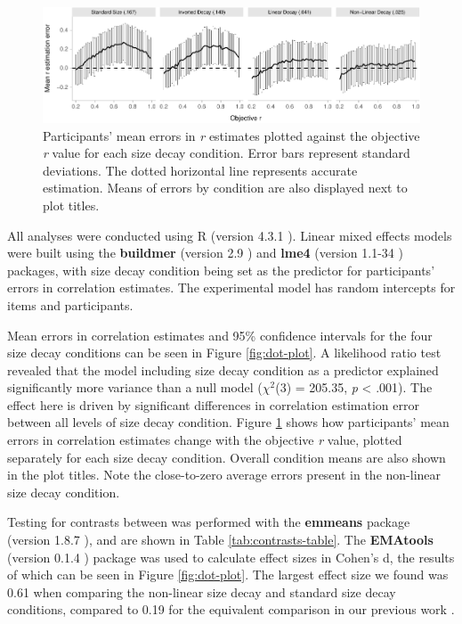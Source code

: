 \documentclass{vgtc}                          %
\begin{document}
\begin{figure}
\includegraphics[width=1\linewidth]{size_and_scatterplots_files/figure-latex/differences-plot-1} \caption{Participants' mean errors in \textit{r} estimates plotted against the objective \textit{r} value for each size decay condition. Error bars represent standard deviations. The dotted horizontal line represents accurate estimation. Means of errors by condition are also displayed next to plot titles.}\label{fig:differences-plot}
\end{figure}

All analyses were conducted using R (version 4.3.1 \cite{r_core}). Linear mixed effects models were
built using the \textbf{buildmer} (version 2.9 \cite{voeten_buildmer}) and \textbf{lme4}
(version 1.1-34 \cite{bates_lme4_2015}) packages, with size decay condition being set
as the predictor for participants' errors in correlation estimates. The experimental
model has random intercepts for items and participants.

Mean errors in correlation estimates and 95\% confidence intervals
for the four size decay conditions can be seen in Figure \ref{fig:dot-plot}.
A likelihood ratio test revealed that the model including size decay condition
as a predictor explained significantly more variance than a null model
(\(\chi^2\)(3) = 205.35,
\emph{p} \textless{} .001). The effect here is driven by
significant differences in correlation estimation error between all levels
of size decay condition. Figure \ref{fig:differences-plot} shows how participants' mean errors in correlation
estimates change with the objective \emph{r} value, plotted separately for each
size decay condition. Overall condition means are also shown in the plot titles.
Note the close-to-zero average errors present in the non-linear size decay condition.

Testing for contrasts between was performed with the \textbf{emmeans} package
(version 1.8.7 \cite{emmeans}), and are shown in Table \ref{tab:contrasts-table}.
The \textbf{EMAtools} (version 0.1.4 \cite{ematools}) package was used to calculate effect sizes in Cohen's d,
the results of which can be seen in Figure \ref{fig:dot-plot}.
The largest effect size we found was 0.61 when comparing
the non-linear size decay and standard size decay conditions, compared to
0.19 for the equivalent comparison in our previous work \cite{strain_2023}.
\end{document}
